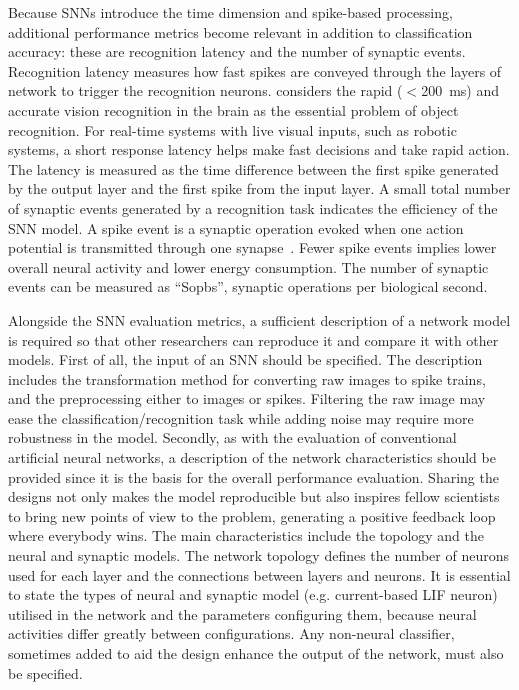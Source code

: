 \documentclass{frontiersENG} %
\begin{document}
Because SNNs introduce the time dimension and spike-based processing, additional performance metrics become relevant in addition to classification accuracy: these are recognition latency and the number of synaptic events.
Recognition latency measures how fast spikes are conveyed through the layers of network to trigger the recognition neurons.
\cite{dicarlo2012does} considers the rapid ($<$200~ms) and accurate vision recognition in the brain as the essential problem of object recognition.
For real-time systems with live visual inputs, such as robotic systems, a short response latency helps make fast decisions and take rapid action.
The latency is measured as the time difference between the first spike generated by the output layer and the first spike from the input layer.
A small total number of synaptic events generated by a recognition task indicates the efficiency of the SNN model.
A spike event is a synaptic operation evoked when one action potential is transmitted through one synapse~\citep{sharp2012power}.
Fewer spike events implies lower overall neural activity and lower energy consumption.
The number of synaptic events can be measured as ``Sopbs'', synaptic operations per biological second.

Alongside the SNN evaluation metrics, a sufficient description of a network model is required so that other researchers can reproduce it and compare it with other models.
First of all, the input of an SNN should be specified.
The description includes the transformation method for converting raw images to spike trains, and the preprocessing either to images or spikes.
Filtering the raw image may ease the classification/recognition task while adding noise may require more robustness in the model.
Secondly, as with the evaluation of conventional artificial neural networks, a description of the network characteristics should be provided since it is the basis for the overall performance evaluation.
Sharing the designs not only makes the model reproducible but also inspires fellow scientists to bring new points of view to the problem, generating a positive feedback loop where everybody wins.
The main characteristics include the topology and the neural and synaptic models.
The network topology defines the number of neurons used for each layer and the connections between layers and neurons.
It is essential to state the types of neural and synaptic model (e.g. current-based LIF neuron) utilised in the network and the parameters configuring them, because neural activities differ greatly between configurations.
Any non-neural classifier, sometimes added to aid the design enhance the output of the network, must also be specified.
\end{document}
